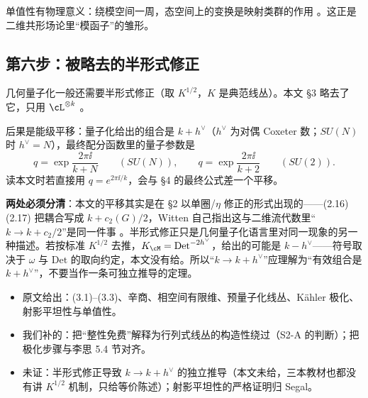 单值性有物理意义：绕模空间一周，态空间上的变换是映射类群的作用 。这正是二维共形场论里“模函子”的雏形。

\subsection{第六步：被略去的半形式修正}

几何量子化一般还需要半形式修正（取 $K^{1/2}$，$K$ 是典范线丛）。本文 §3 略去了它，只用 $\cL^{\otimes k}$ 。

后果是能级平移：量子化给出的组合是 $k+h^\vee$（$h^\vee$ 为对偶 Coxeter 数；$SU(N)$ 时 $h^\vee=N$），最终配分函数里的量子参数是 
\begin{equation}
q=\exp\frac{2\pi\ii}{k+N}\qquad(SU(N)),\qquad
q=\exp\frac{2\pi\ii}{k+2}\qquad(SU(2)).
\label{eq:q}
\end{equation}
读本文时若直接用 $q=e^{2\pi\ii/k}$，会与 §4 的最终公式差一个平移。

\begin{keypoint}
\textbf{两处必须分清}：本文的平移其实是在 §2 以单圈/$\eta$ 修正的形式出现的——(2.16)(2.17) 把耦合写成 $k+c_2(G)/2$，Witten 自己指出这与二维流代数里“$k\to k+c_2/2$”是同一件事 。半形式修正只是几何量子化语言里对同一现象的另一种描述。若按标准 $K^{1/2}$ 去推，$K_{\cM}=\mathrm{Det}^{-2h^\vee}$，给出的可能是 $k-h^\vee$——符号取决于 $\omega$ 与 $\mathrm{Det}$ 的取向约定，本文没有给。所以“$k\to k+h^\vee$”应理解为“有效组合是 $k+h^\vee$”，不要当作一条可独立推导的定理。
\end{keypoint}

\begin{boundary}
\begin{itemize}[leftmargin=1.4em]
\item 原文给出：(3.1)--(3.3)、辛商、相空间有限维、预量子化线丛、K\"ahler 极化、射影平坦性与单值性。
\item 我们补的：把“整性免费”解释为行列式线丛的构造性绕过（S2-A 的判断）；把极化步骤与李思 5.4 节对齐。
\item 未证：半形式修正导致 $k\to k+h^\vee$ 的独立推导（本文未给，三本教材也都没有讲 $K^{1/2}$ 机制，只给等价陈述）；射影平坦性的严格证明归 Segal。
\end{itemize}
\end{boundary}
